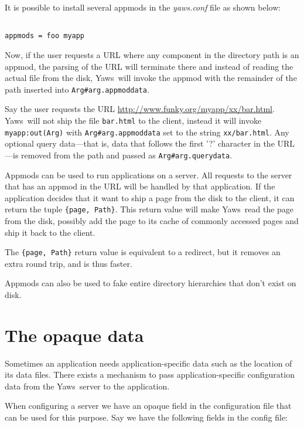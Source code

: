 \documentclass[11pt,oneside,english]{book}
\newcommand{\Yaws}            %
        {{\sc Yaws}}
\begin{document}
It is possible to install several appmods in the \textit{yaws.conf}
file as shown below:

\begin{verbatim}

appmods = foo myapp

\end{verbatim}

Now, if the user requests a URL where any component in the
directory path is an appmod, the parsing of the URL will terminate
there and instead of reading the actual file from the disk, \Yaws\  will
invoke the appmod with the remainder of the path inserted into
\verb+Arg#arg.appmoddata+.

Say the user requests the URL
\url{http://www.funky.org/myapp/xx/bar.html}.  \Yaws\ will not ship
the file \verb+bar.html+ to the client, instead it will invoke
\verb+myapp:out(Arg)+ with \verb+Arg#arg.appmoddata+ set to the string
\verb+xx/bar.html+. Any optional query data---that is, data that
follows the first '?' character in the URL---is removed from the path
and passed as \verb+Arg#arg.querydata+.

Appmods can be used to run applications on a server. All requests
to the server that has an appmod in the URL will be handled by that
application. If the application decides that it want to
ship a page from the disk to the client, it can return the
tuple \verb+{page, Path}+. This return value will make \Yaws\  read
the page from the disk, possibly add the page to its cache of
commonly accessed pages and ship it back to the client.

The \verb+{page, Path}+ return value is equivalent to a
redirect, but it removes an extra round trip, and is thus faster.

Appmods can also be used to fake entire directory hierarchies
that don't exist on disk.


\section{The opaque data}

Sometimes an application needs application-specific data such as the
location of its data files. There exists a mechanism to pass
application-specific configuration data from the \Yaws\ server to the
application.

When configuring a server we have an opaque field in the configuration
file that can be used for this purpose.  Say we have the following
fields in the config file:
\end{document}
